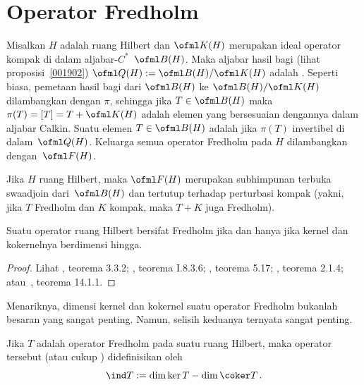 \section{Operator Fredholm}
\begin{defn} Misalkan $H$ adalah ruang Hilbert dan $\ofml K(H)$ merupakan ideal operator kompak di dalam
aljabar-$C^*$~$\ofml B(H)$. Maka aljabar hasil bagi (lihat proposisi~\ref{001902})
$\ofml Q(H) := \ofml B(H)/\ofml K(H)$ adalah
. Seperti biasa, pemetaan hasil bagi dari $\ofml B(H)$ ke $\ofml
B(H)/\ofml K(H)$
dilambangkan dengan $\pi$, sehingga jika $T \in \ofml B(H)$ maka $\pi(T) = [T] = T + \ofml K(H)$ adalah
elemen yang bersesuaian dengannya dalam aljabar Calkin. Suatu elemen $T \in \ofml B(H)$ adalah
 jika $\pi(T)$ invertibel di dalam~$\ofml Q(H)$. Keluarga
semua operator Fredholm pada $H$ dilambangkan dengan~$\ofml F(H)$.
\end{defn}

\begin{prop} Jika $H$ ruang Hilbert, maka $\ofml F(H)$ merupakan subhimpunan terbuka swaadjoin
dari~$\ofml B(H)$ dan tertutup terhadap
perturbasi kompak (yakni, jika $T$ Fredholm dan $K$ kompak, maka $T + K$ juga Fredholm).
\end{prop}

\begin{thm}\label{004352}
Suatu operator ruang Hilbert bersifat Fredholm jika dan hanya jika kernel dan kokernelnya
berdimensi hingga.
\end{thm}

\begin{proof} Lihat \cite{Arveson:2002}, teorema 3.3.2; \cite{Blackadar:2006}, teorema I.8.3.6;
\cite{Douglas:1972}, teorema 5.17; \cite{HigsonR:2000}, teorema 2.1.4;
atau~\cite{Wegge-Olsen:1993}, teorema 14.1.1. \ns
\end{proof}

Menariknya, dimensi kernel dan kokernel suatu operator Fredholm bukanlah besaran yang
sangat penting. Namun, selisih keduanya ternyata sangat penting.

\begin{defn} Jika $T$ adalah operator Fredholm pada suatu ruang Hilbert, maka
 operator tersebut (atau cukup ) didefinisikan oleh
   \[ \ind T := \dim\ker T - \dim\coker T\,. \]
\end{defn}

